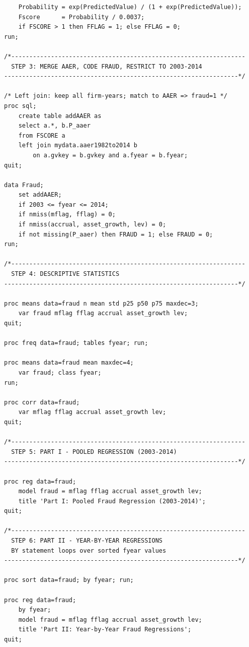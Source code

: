 \documentclass[12pt]{article}
\begin{document}
\begin{lstlisting}
    Probability = exp(PredictedValue) / (1 + exp(PredictedValue));
    Fscore      = Probability / 0.0037;
    if FSCORE > 1 then FFLAG = 1; else FFLAG = 0;
run;

/*-----------------------------------------------------------------
  STEP 3: MERGE AAER, CODE FRAUD, RESTRICT TO 2003-2014
-----------------------------------------------------------------*/

/* Left join: keep all firm-years; match to AAER => fraud=1 */
proc sql;
    create table addAAER as
    select a.*, b.P_aaer
    from FSCORE a
    left join mydata.aaer1982to2014 b
        on a.gvkey = b.gvkey and a.fyear = b.fyear;
quit;

data Fraud;
    set addAAER;
    if 2003 <= fyear <= 2014;
    if nmiss(mflag, fflag) = 0;
    if nmiss(accrual, asset_growth, lev) = 0;
    if not missing(P_aaer) then FRAUD = 1; else FRAUD = 0;
run;

/*-----------------------------------------------------------------
  STEP 4: DESCRIPTIVE STATISTICS
-----------------------------------------------------------------*/

proc means data=fraud n mean std p25 p50 p75 maxdec=3;
    var fraud mflag fflag accrual asset_growth lev;
quit;

proc freq data=fraud; tables fyear; run;

proc means data=fraud mean maxdec=4;
    var fraud; class fyear;
run;

proc corr data=fraud;
    var mflag fflag accrual asset_growth lev;
quit;

/*-----------------------------------------------------------------
  STEP 5: PART I - POOLED REGRESSION (2003-2014)
-----------------------------------------------------------------*/

proc reg data=fraud;
    model fraud = mflag fflag accrual asset_growth lev;
    title 'Part I: Pooled Fraud Regression (2003-2014)';
quit;

/*-----------------------------------------------------------------
  STEP 6: PART II - YEAR-BY-YEAR REGRESSIONS
  BY statement loops over sorted fyear values
-----------------------------------------------------------------*/

proc sort data=fraud; by fyear; run;

proc reg data=fraud;
    by fyear;
    model fraud = mflag fflag accrual asset_growth lev;
    title 'Part II: Year-by-Year Fraud Regressions';
quit;
\end{lstlisting}
\end{document}
